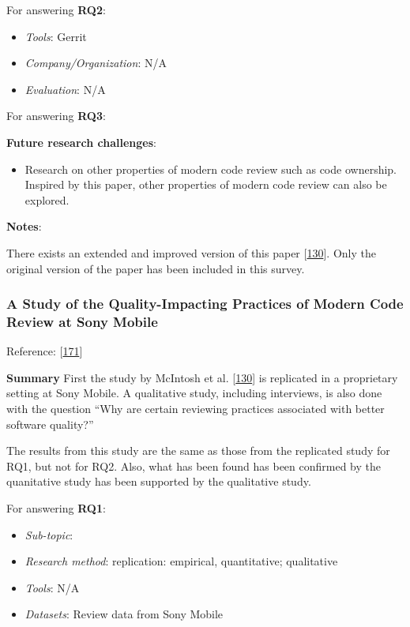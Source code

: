 \documentclass[]{book}
\providecommand{\tightlist}{%
  \setlength{\itemsep}{0pt}\setlength{\parskip}{0pt}}
\begin{document}
For answering \textbf{RQ2}:

\begin{itemize}
\tightlist
\item
  \emph{Tools}: Gerrit
\item
  \emph{Company/Organization}: N/A
\item
  \emph{Evaluation}: N/A
\end{itemize}

For answering \textbf{RQ3}:

\textbf{Future research challenges}:

\begin{itemize}
\tightlist
\item
  Research on other properties of modern code review such as code
  ownership. Inspired by this paper, other properties of modern code
  review can also be explored.
\end{itemize}

\textbf{Notes}:

There exists an extended and improved version of this paper
{[}\protect\hyperlink{ref-mcintosh2016empirical}{130}{]}. Only the
original version of the paper has been included in this survey.

\subsubsection{A Study of the Quality-Impacting Practices of Modern Code
Review at Sony
Mobile}\label{a-study-of-the-quality-impacting-practices-of-modern-code-review-at-sony-mobile}

Reference: {[}\protect\hyperlink{ref-shimagaki2016study}{171}{]}

\textbf{Summary} First the study by McIntosh et al.
{[}\protect\hyperlink{ref-mcintosh2016empirical}{130}{]} is replicated
in a proprietary setting at Sony Mobile. A qualitative study, including
interviews, is also done with the question ``Why are certain reviewing
practices associated with better software quality?''

The results from this study are the same as those from the replicated
study for RQ1, but not for RQ2. Also, what has been found has been
confirmed by the quanitative study has been supported by the qualitative
study.

For answering \textbf{RQ1}:

\begin{itemize}
\tightlist
\item
  \emph{Sub-topic}:
\item
  \emph{Research method}: replication: empirical, quantitative;
  qualitative
\item
  \emph{Tools}: N/A
\item
  \emph{Datasets}: Review data from Sony Mobile
\end{itemize}
\end{document}
